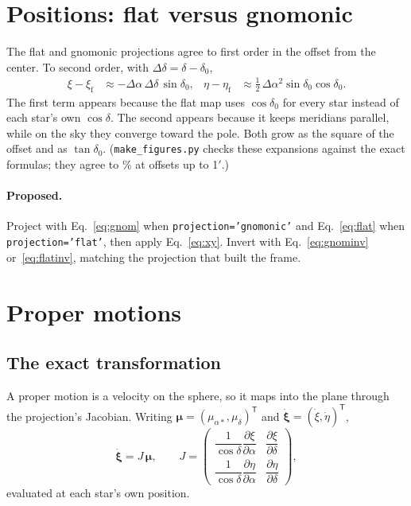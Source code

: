 \documentclass[11pt]{article}
\newcommand{\code}[1]{\texttt{#1}}
\begin{document}
\section{Positions: flat versus gnomonic}
\label{sec:positions}

The flat and gnomonic projections agree to first order in the offset from the
center. To second order, with $\Delta\delta = \delta-\delta_0$,
\begin{align}
  \xi - \xi_\mathrm{f}   &\approx -\Delta\alpha\,\Delta\delta\,\sin\delta_0, &
  \eta - \eta_\mathrm{f} &\approx \tfrac12\,\Delta\alpha^2 \sin\delta_0\cos\delta_0 .
\end{align}
The first term appears because the flat map uses $\cos\delta_0$ for every star
instead of each star's own $\cos\delta$. The second appears because it keeps
meridians parallel, while on the sky they converge toward the pole. Both grow
as the square of the offset and as $\tan\delta_0$. (\code{make\_figures.py}
checks these expansions against the exact formulas; they agree to
\ExpansionWorst\% at offsets up to 1$'$.)

\paragraph{Proposed.} Project with Eq.~\eqref{eq:gnom} when
\code{projection='gnomonic'} and Eq.~\eqref{eq:flat} when
\code{projection='flat'}, then apply Eq.~\eqref{eq:xy}. Invert with
Eq.~\eqref{eq:gnominv} or~\eqref{eq:flatinv}, matching the projection that
built the frame.

\section{Proper motions}
\label{sec:pm}

\subsection{The exact transformation}

A proper motion is a velocity on the sphere, so it maps into the plane through
the projection's Jacobian. Writing $\boldsymbol\mu = (\mu_{\alpha*},\mu_\delta)^{\mathsf T}$
and $\dot{\boldsymbol\xi} = (\dot\xi,\dot\eta)^{\mathsf T}$,
\begin{equation}
  \dot{\boldsymbol\xi} = J\,\boldsymbol\mu, \qquad
  J = \begin{pmatrix}
    \dfrac{1}{\cos\delta}\dfrac{\partial\xi}{\partial\alpha} & \dfrac{\partial\xi}{\partial\delta}\\[2ex]
    \dfrac{1}{\cos\delta}\dfrac{\partial\eta}{\partial\alpha} & \dfrac{\partial\eta}{\partial\delta}
  \end{pmatrix},
  \label{eq:jac}
\end{equation}
evaluated at each star's own position.
\end{document}

